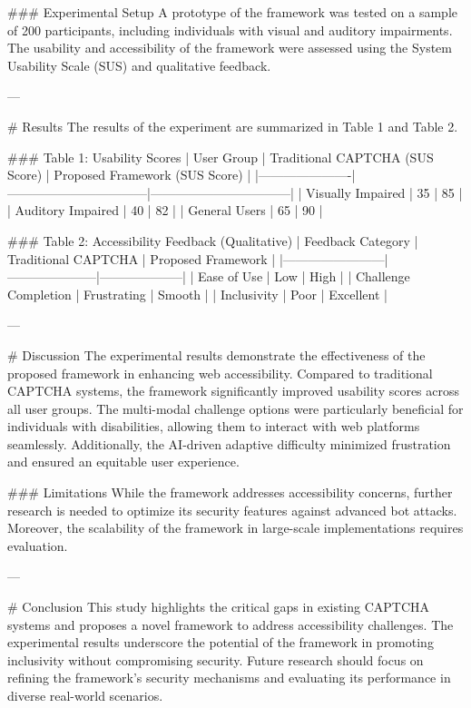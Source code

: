 ### Experimental Setup  
A prototype of the framework was tested on a sample of 200 participants, including individuals with visual and auditory impairments. The usability and accessibility of the framework were assessed using the System Usability Scale (SUS) and qualitative feedback.

---

# Results  
The results of the experiment are summarized in Table 1 and Table 2.  

### Table 1: Usability Scores  
| User Group           | Traditional CAPTCHA (SUS Score) | Proposed Framework (SUS Score) |  
|----------------------|---------------------------------|---------------------------------|  
| Visually Impaired    | 35                              | 85                              |  
| Auditory Impaired    | 40                              | 82                              |  
| General Users        | 65                              | 90                              |  

### Table 2: Accessibility Feedback (Qualitative)  
| Feedback Category      | Traditional CAPTCHA | Proposed Framework |  
|------------------------|---------------------|--------------------|  
| Ease of Use            | Low                | High               |  
| Challenge Completion   | Frustrating        | Smooth             |  
| Inclusivity            | Poor               | Excellent          |  

---

# Discussion  
The experimental results demonstrate the effectiveness of the proposed framework in enhancing web accessibility. Compared to traditional CAPTCHA systems, the framework significantly improved usability scores across all user groups. The multi-modal challenge options were particularly beneficial for individuals with disabilities, allowing them to interact with web platforms seamlessly. Additionally, the AI-driven adaptive difficulty minimized frustration and ensured an equitable user experience.

### Limitations  
While the framework addresses accessibility concerns, further research is needed to optimize its security features against advanced bot attacks. Moreover, the scalability of the framework in large-scale implementations requires evaluation.

---

# Conclusion  
This study highlights the critical gaps in existing CAPTCHA systems and proposes a novel framework to address accessibility challenges. The experimental results underscore the potential of the framework in promoting inclusivity without compromising security. Future research should focus on refining the framework’s security mechanisms and evaluating its performance in diverse real-world scenarios.


